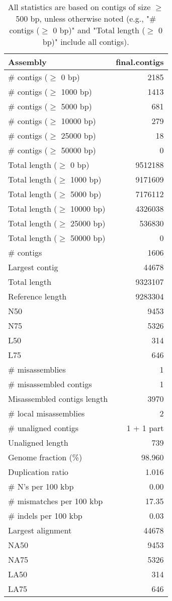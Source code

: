 \documentclass[12pt,a4paper]{article}
\begin{document}
\begin{table}[ht]
\begin{center}
\caption{All statistics are based on contigs of size $\geq$ 500 bp, unless otherwise noted (e.g., "\# contigs ($\geq$ 0 bp)" and "Total length ($\geq$ 0 bp)" include all contigs).}
\begin{tabular}{|l*{1}{|r}|}
\hline
Assembly & final.contigs \\ \hline
\# contigs ($\geq$ 0 bp) & 2185 \\ \hline
\# contigs ($\geq$ 1000 bp) & 1413 \\ \hline
\# contigs ($\geq$ 5000 bp) & 681 \\ \hline
\# contigs ($\geq$ 10000 bp) & 279 \\ \hline
\# contigs ($\geq$ 25000 bp) & 18 \\ \hline
\# contigs ($\geq$ 50000 bp) & 0 \\ \hline
Total length ($\geq$ 0 bp) & 9512188 \\ \hline
Total length ($\geq$ 1000 bp) & 9171609 \\ \hline
Total length ($\geq$ 5000 bp) & 7176112 \\ \hline
Total length ($\geq$ 10000 bp) & 4326038 \\ \hline
Total length ($\geq$ 25000 bp) & 536830 \\ \hline
Total length ($\geq$ 50000 bp) & 0 \\ \hline
\# contigs & 1606 \\ \hline
Largest contig & 44678 \\ \hline
Total length & 9323107 \\ \hline
Reference length & 9283304 \\ \hline
N50 & 9453 \\ \hline
N75 & 5326 \\ \hline
L50 & 314 \\ \hline
L75 & 646 \\ \hline
\# misassemblies & 1 \\ \hline
\# misassembled contigs & 1 \\ \hline
Misassembled contigs length & 3970 \\ \hline
\# local misassemblies & 2 \\ \hline
\# unaligned contigs & 1 + 1 part \\ \hline
Unaligned length & 739 \\ \hline
Genome fraction (\%) & 98.960 \\ \hline
Duplication ratio & 1.016 \\ \hline
\# N's per 100 kbp & 0.00 \\ \hline
\# mismatches per 100 kbp & 17.35 \\ \hline
\# indels per 100 kbp & 0.03 \\ \hline
Largest alignment & 44678 \\ \hline
NA50 & 9453 \\ \hline
NA75 & 5326 \\ \hline
LA50 & 314 \\ \hline
LA75 & 646 \\ \hline
\end{tabular}
\end{center}
\end{table}
\end{document}
